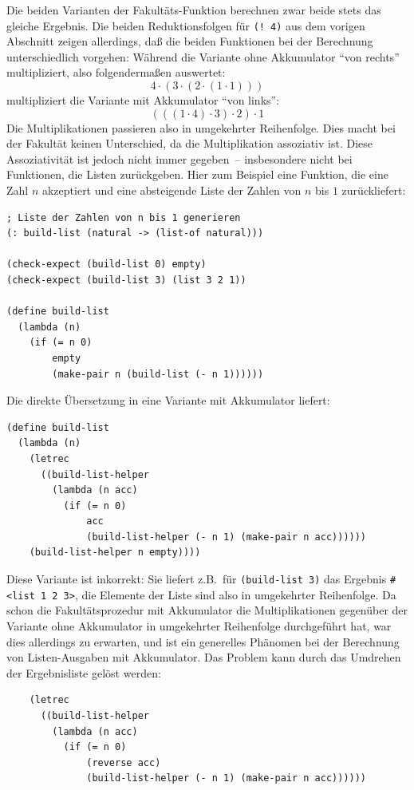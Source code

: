 Die beiden Varianten der Fakultäts-Funktion berechnen zwar beide 
stets das gleiche Ergebnis.  Die beiden Reduktionsfolgen für
\texttt{(! 4)} aus dem vorigen Abschnitt zeigen allerdings, daß die
beiden Funktionen bei der Berechnung unterschiedlich vorgehen:
Während die Variante ohne Akkumulator "`von rechts"' multipliziert,
also folgendermaßen auswertet:
%
\begin{displaymath}
  4\cdot (3 \cdot (2 \cdot (1 \cdot 1)))
\end{displaymath}
%
multipliziert die Variante mit Akkumulator "`von links"':
%
\begin{displaymath}
  (((1 \cdot 4)\cdot 3)\cdot 2)\cdot 1
\end{displaymath}
%
Die Multiplikationen passieren also in umgekehrter Reihenfolge.
Dies macht bei der Fakultät keinen Unterschied, da die Multiplikation
assoziativ ist.  Diese Assoziativität ist jedoch nicht immer
gegeben~-- insbesondere nicht bei Funktionen, die Listen zurückgeben.
Hier zum Beispiel eine Funktion, die eine Zahl $n$ akzeptiert und eine
absteigende Liste der Zahlen von $n$ bis $1$ zurückliefert:
%
\begin{verbatim}
; Liste der Zahlen von n bis 1 generieren
(: build-list (natural -> (list-of natural)))

(check-expect (build-list 0) empty)
(check-expect (build-list 3) (list 3 2 1))

(define build-list
  (lambda (n)
    (if (= n 0)
        empty
        (make-pair n (build-list (- n 1))))))
\end{verbatim}
%
Die direkte Übersetzung in eine Variante mit Akkumulator liefert:
%
\begin{verbatim}
(define build-list
  (lambda (n)
    (letrec
      ((build-list-helper
        (lambda (n acc)
          (if (= n 0)
              acc
              (build-list-helper (- n 1) (make-pair n acc))))))
    (build-list-helper n empty))))
\end{verbatim}
%
Diese Variante ist inkorrekt: Sie liefert z.B.\ für
\texttt{(build-list 3)} das Ergebnis \verb|#<list 1 2 3>|, die
Elemente der Liste sind also in umgekehrter Reihenfolge.  Da schon die
Fakultätsprozedur mit Akkumulator die Multiplikationen gegenüber der
Variante ohne Akkumulator in umgekehrter Reihenfolge durchgeführt hat, war dies allerdings zu
erwarten, und ist ein generelles Phänomen bei der Berechnung von
Listen-Ausgaben mit Akkumulator.  Das Problem kann durch das Umdrehen
der Ergebnisliste gelöst werden:
%
\begin{verbatim}
    (letrec
      ((build-list-helper
        (lambda (n acc)
          (if (= n 0)
              (reverse acc)
              (build-list-helper (- n 1) (make-pair n acc))))))
\end{verbatim}
%


